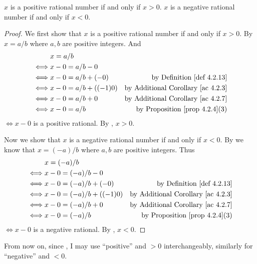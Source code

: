 \begin{additional corollary} \label{ac 4.2.8}
\(x\) is a positive rational number if and only if \(x > 0\).
\(x\) is a negative rational number if and only if \(x < 0\).
\end{additional corollary}

\begin{proof}
We first show that \(x\) is a positive rational number if and only if \(x > 0\).
By  \(x = a / b\) where \(a, b\) are positive integers.
And
\begin{align*}
         & x = a / b \\
    \iff & x - 0 = a / b - 0 \\
    \iff & x - 0 = a / b + (-0) & \text{by \DEF{4.2.13}} \\
    \iff & x - 0 = a / b + ((-1)0) & \text{by \AC{4.2.3}} \\
    \iff & x - 0 = a / b + 0 & \text{by \AC{4.2.7}} \\
    \iff & x - 0 = a / b & \text{by \PROP{4.2.4}(3)}
\end{align*}
\(\iff x - 0\) is a positive rational.
By , \(x > 0\).

Now we show that \(x\) is a negative rational number if and only if \(x < 0\).
By  we know that \(x = (-a) / b\) where \(a, b\) are positive integers.
Thus
\begin{align*}
         & x = (-a) / b \\
    \iff & x - 0 = (-a) / b - 0 \\
    \iff & x - 0 = (-a) / b + (-0) & \text{by \DEF{4.2.13}} \\
    \iff & x - 0 = (-a) / b + ((-1)0) & \text{by \AC{4.2.3}} \\
    \iff & x - 0 = (-a) / b + 0 & \text{by \AC{4.2.7}} \\
    \iff & x - 0 = (-a) / b & \text{by \PROP{4.2.4}(3)}
\end{align*}
\(\iff x - 0\) is a negative rational.
By , \(x < 0\).
\end{proof}

\begin{note}
From now on, since , I may use ``positive'' and \(> 0\) interchangeably, similarly for ``negative'' and \(< 0\).
\end{note}

